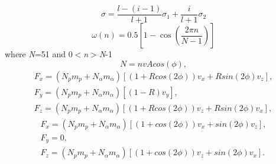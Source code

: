 \begin{equation}\label{eq:Gaussian Window Equations}
\sigma=\frac{l-(i-1)}{l+1}\sigma_{1}+\frac{i}{l+1}\sigma_{2}
\end{equation}
\begin{equation}\label{eq:Hanning Window}
\omega(n)=0.5[1-\cos{(\frac{2\pi n}{N-1})}]
\end{equation}
where \textit{N}=51 and 0$<$\textit{n}$>$\textit{N}-1
\begin{equation}\label{eq:Hanning Window}
N=n v Acos(\phi),
\end{equation}
\begin{equation}\label{eq:Hanning Window}
\begin{split}
F_{x}=(N_{p}m_{p}+N_{\alpha}m_{\alpha})[(1+Rcos(2\phi))v_{x}+Rsin(2\phi)v_{z}], \\ F_{y}=(N_{p}m_{p}+N_{\alpha}m_{\alpha})[(1-R)v_{y}], \\ F_{z}=(N_{p}m_{p}+N_{\alpha}m_{\alpha})[(1+Rcos(2\phi))v_{z}+Rsin(2\phi)v_{x}],
\end{split}
\end{equation}
\begin{equation}\label{eq:Hanning Window}
\begin{split}
F_{x}=(N_{p}m_{p}+N_{\alpha}m_{\alpha})[(1+cos(2\phi))v_{x}+sin(2\phi)v_{z}], \\ F_{y}=0, \\ F_{z}=(N_{p}m_{p}+N_{\alpha}m_{\alpha})[(1+cos(2\phi))v_{z}+sin(2\phi)v_{x}].
\end{split}
\end{equation}